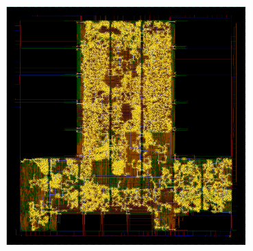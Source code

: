 \documentclass[compress]{beamer}
\begin{document}
\begin{frame}
	\begin{center}
		\includegraphics[width=0.7\textwidth]{clk6}
	\end{center}
\end{frame}
\end{document}
